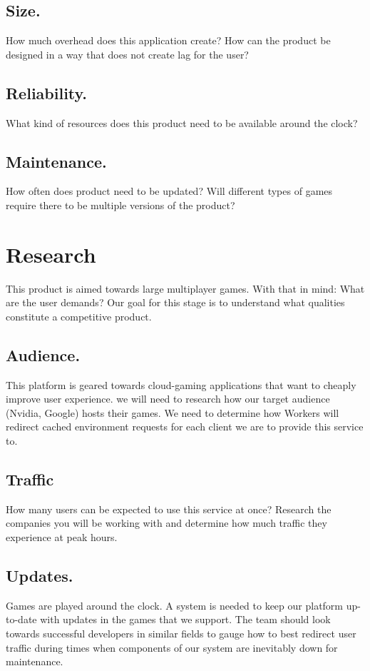 \documentclass[12pt,journal,compsoc]{IEEEtran}
\begin{document}
    \subsection{Size.}\hphantom{m}How much overhead does this application create? How can the product be designed in a way that does not create lag for the user?
    \subsection{Reliability.}\hphantom{m}What kind of resources does this product need to be available around the clock?
    \subsection{Maintenance.}\hphantom{m}How often does product need to be updated? Will different types of games require there to be multiple versions of the product?
    
\section{Research} This product is aimed towards large multiplayer games. With that in mind: What are the user demands? Our goal for this stage is to understand what qualities constitute a competitive product.
    \subsection{Audience.}\hphantom{m}This platform is geared towards cloud-gaming applications that want to cheaply improve user experience. we will need to research how our target audience (Nvidia, Google) hosts their games. We need to determine how Workers will redirect cached environment requests for each client we are to provide this service to.
    \subsection{Traffic}\hphantom{m}How many users can be expected to use this service at once? Research the companies you will be working with and determine how much traffic they experience at peak hours.
    \subsection{Updates.}\hphantom{m}Games are played around the clock. A system is needed to keep our platform up-to-date with updates in the games that we support. The team should look towards successful developers in similar fields to gauge how to best redirect user traffic during times when components of our system are inevitably down for maintenance.
    
\end{document}
